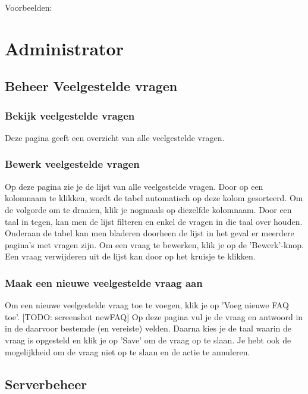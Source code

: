 \documentclass[]{article}
\begin{document}
Voorbeelden:

 

\section{Administrator}

\subsection{Beheer Veelgestelde vragen}

\subsubsection{Bekijk veelgestelde vragen}
Deze pagina geeft een overzicht van alle veelgestelde vragen.

\subsubsection{Bewerk veelgestelde vragen}
Op deze pagina zie je de lijst van alle veelgestelde vragen. Door op een kolomnaam te klikken, wordt de tabel automatisch op deze kolom gesorteerd. Om de volgorde om te draaien, klik je nogmaals op diezelfde kolomnaam. Door een taal in tegen, kan men de lijst filteren en enkel de vragen in die taal over houden. Onderaan de tabel kan men bladeren doorheen de lijst in het geval er meerdere pagina's met vragen zijn. Om een vraag te bewerken, klik je op de 'Bewerk'-knop. Een vraag verwijderen uit de lijst kan door op het kruisje te klikken.

\subsubsection{Maak een nieuwe veelgestelde vraag aan}
Om een nieuwe veelgestelde vraag toe te voegen, klik je op 'Voeg nieuwe FAQ toe'. [TODO: screenshot newFAQ] Op deze pagina vul je de vraag en antwoord in in de daarvoor bestemde (en vereiste) velden. Daarna kies je de taal waarin de vraag is opgesteld en klik je op 'Save' om de vraag op te slaan. Je hebt ook de mogelijkheid om de vraag niet op te slaan en de actie te annuleren.

\subsection{Serverbeheer}
\end{document}
